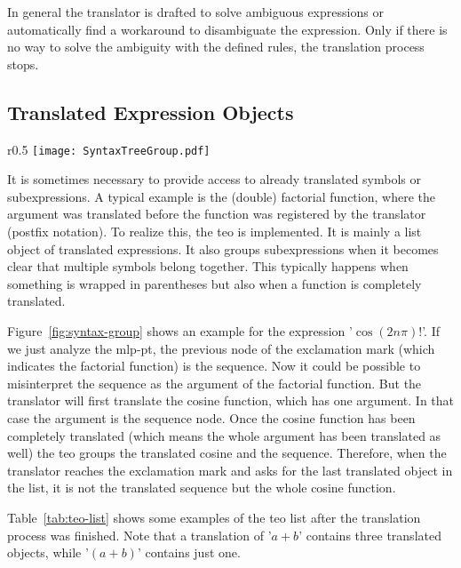 In general the translator is drafted to solve ambiguous expressions or automatically find a workaround to disambiguate the expression. Only if there is no way to solve the ambiguity with the defined rules, the translation process stops.

\subsection{Translated Expression Objects}\label{subsec:translated-expr}
\begin{wrapfigure}{r}{0.5\textwidth}
	\vspace{-20pt}
	\centering
	\texttt{[image: SyntaxTreeGroup.pdf]}
	\caption{The MLP-PT for '$\cos(2n\pi)!$' and the grouped argument of the factorial function.}
	\label{fig:syntax-group}
	\vspace{-15pt}
\end{wrapfigure}

It is sometimes necessary to provide access to already translated symbols or subexpressions. A typical example is the (double) factorial function, where the argument was translated before the function was registered by the translator (postfix notation). To realize this, the \gls{teo} is implemented. It is mainly a list object of translated expressions. It also groups subexpressions when it becomes clear that multiple symbols belong together. This typically happens when something is wrapped in parentheses but also when a function is completely translated.   

Figure~\ref{fig:syntax-group} shows an example for the expression '$\cos(2n\pi)!$'. If we just analyze the \gls{mlp-pt}, the previous node of the exclamation mark (which indicates the factorial function) is the sequence. Now it could be possible to misinterpret the sequence as the argument of the factorial function. But the translator will first translate the cosine function, which has one argument. In that case the argument is the sequence node. Once the cosine function has been completely translated (which means the whole argument has been translated as well) the \gls{teo} groups the translated cosine and the sequence. Therefore, when the translator reaches the exclamation mark and asks for the last translated object in the list, it is not the translated sequence but the whole cosine function.

Table~\ref{tab:teo-list} shows some examples of the \gls{teo} list after the translation process was finished. Note that a translation of '$a+b$' contains three translated objects, while '$(a+b)$' contains just one.

